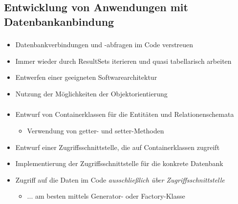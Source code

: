 \subsection{Entwicklung von Anwendungen mit Datenbankanbindung}

\begin{frame}
	\frametitle{\insertsection}
	\framesubtitle{\insertsubsection}
	\begin{itemize}
		\item Datenbankverbindungen und -abfragen im Code verstreuen
		\item Immer wieder durch ResultSets iterieren und quasi tabellarisch arbeiten
	\end{itemize}
\abs
	\begin{itemize}
		\item Entwerfen einer geeigneten Softwarearchitektur
		\item Nutzung der M\"oglichkeiten der Objektorientierung
	\end{itemize}	
\end{frame}

\begin{frame}
	\frametitle{\insertsection}
	\framesubtitle{\insertsubsection}
	\onslide
	\begin{itemize}
		\item Entwurf von Containerklassen f\"ur die Entit\"aten und Relationenschemata
		\begin{itemize}
			\item Verwendung von getter- und setter-Methoden
		\end{itemize}
 	  \pause
		\item Entwurf einer Zugriffsschnittstelle, die auf Containerklassen zugreift
		\pause
		\item Implementierung der Zugriffsschnittstelle f\"ur die konkrete Datenbank
		\pause
		\item Zugriff auf die Daten im Code \textit{ausschließlich über Zugriffsschnittstelle}
		\begin{itemize}
			\item ... am besten mittels Generator- oder Factory-Klasse
		\end{itemize}
	\end{itemize}
\end{frame}


